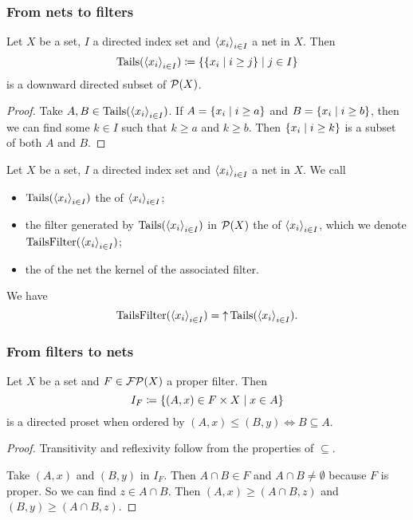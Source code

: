 \subsubsection{From nets to filters}
\begin{lemma}
Let $X$ be a set, $I$ a directed index set and $\left\langle x_i \right\rangle_{i\in I}$ a net in $X$. Then
\[ \operatorname{Tails}(\left\langle x_i \right\rangle_{i\in I}) \coloneqq \left\{ \left\{ x_i \;\middle|\; i \geq j \right\} \;\middle|\; j\in I \right\} \]
is a downward directed subset of $\operatorname{\mathcal{P}}(X)$.
\end{lemma}
\begin{proof}
Take $A,B\in \operatorname{Tails}(\left\langle x_i \right\rangle_{i\in I})$. If $A = \left\{ x_i \;\middle|\; i \geq a \right\}$ and $B = \left\{ x_i \;\middle|\; i \geq b \right\}$, then we can find some $k\in I$ such that $k \geq a$ and $k\geq b$. Then $\left\{ x_i \;\middle|\; i \geq k \right\}$ is a subset of both $A$ and $B$.
\end{proof}

\begin{definition}
Let $X$ be a set, $I$ a directed index set and $\left\langle x_i \right\rangle_{i\in I}$ a net in $X$. We call
\begin{itemize}
\item $\operatorname{Tails}(\left\langle x_i \right\rangle_{i\in I})$ the  of $\left\langle x_i \right\rangle_{i\in I}$;
\item the filter generated by $\operatorname{Tails}(\left\langle x_i \right\rangle_{i\in I})$ in $\operatorname{\mathcal{P}}(X)$ the  of $\left\langle x_i \right\rangle_{i\in I}$, which we denote $\operatorname{TailsFilter}(\left\langle x_i \right\rangle_{i\in I})$;
\item the  of the net the kernel of the associated filter.
\end{itemize}
We have 
\[ \operatorname{TailsFilter}(\left\langle x_i \right\rangle_{i\in I}) = \operatorname{\uparrow} \operatorname{Tails}(\left\langle x_i \right\rangle_{i\in I}). \]
\end{definition}

\subsubsection{From filters to nets}
\begin{lemma} \label{filterIndex}
Let $X$ be a set and $F\in\operatorname{\mathcal{FP}}(X)$ a proper filter. Then
\[ I_F \coloneqq \left\{ (A,x)\in F\times X \;\middle|\; x\in A \right\} \]
is a directed proset when ordered by $(A,x)\leq (B,y) \iff B\subseteq A$.
\end{lemma}
\begin{proof}
Transitivity and reflexivity follow from the properties of $\subseteq$.

Take $(A,x)$ and $(B,y)$ in $I_F$. Then $A\cap B\in F$ and $A\cap B \neq \emptyset$ because $F$ is proper. So we can find $z\in A\cap B$. Then $(A,x) \geq (A\cap B,z)$ and $(B,y) \geq (A\cap B, z)$.
\end{proof}


